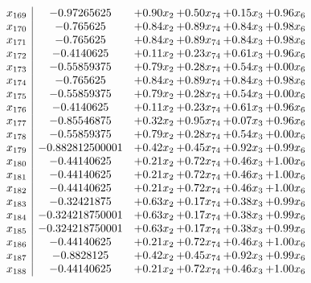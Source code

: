 \documentclass[8pt]{article}
\begin{document}
\[\begin{array}{c| c c@{\hskip 2pt} c@{\hskip 2pt} c@{\hskip 2pt} c@{\hskip 2pt} }
 x_{169}   &  -0.97265625 & +  0.90 x_{2} & +  0.50 x_{74} & +  0.15 x_{3} & +  0.96 x_{6}\\
 x_{170}   &  -0.765625 & +  0.84 x_{2} & +  0.89 x_{74} & +  0.84 x_{3} & +  0.98 x_{6}\\
 x_{171}   &  -0.765625 & +  0.84 x_{2} & +  0.89 x_{74} & +  0.84 x_{3} & +  0.98 x_{6}\\
 x_{172}   &  -0.4140625 & +  0.11 x_{2} & +  0.23 x_{74} & +  0.61 x_{3} & +  0.96 x_{6}\\
 x_{173}   &  -0.55859375 & +  0.79 x_{2} & +  0.28 x_{74} & +  0.54 x_{3} & +  0.00 x_{6}\\
 x_{174}   &  -0.765625 & +  0.84 x_{2} & +  0.89 x_{74} & +  0.84 x_{3} & +  0.98 x_{6}\\
 x_{175}   &  -0.55859375 & +  0.79 x_{2} & +  0.28 x_{74} & +  0.54 x_{3} & +  0.00 x_{6}\\
 x_{176}   &  -0.4140625 & +  0.11 x_{2} & +  0.23 x_{74} & +  0.61 x_{3} & +  0.96 x_{6}\\
 x_{177}   &  -0.85546875 & +  0.32 x_{2} & +  0.95 x_{74} & +  0.07 x_{3} & +  0.96 x_{6}\\
 x_{178}   &  -0.55859375 & +  0.79 x_{2} & +  0.28 x_{74} & +  0.54 x_{3} & +  0.00 x_{6}\\
 x_{179}   &  -0.882812500001 & +  0.42 x_{2} & +  0.45 x_{74} & +  0.92 x_{3} & +  0.99 x_{6}\\
 x_{180}   &  -0.44140625 & +  0.21 x_{2} & +  0.72 x_{74} & +  0.46 x_{3} & +  1.00 x_{6}\\
 x_{181}   &  -0.44140625 & +  0.21 x_{2} & +  0.72 x_{74} & +  0.46 x_{3} & +  1.00 x_{6}\\
 x_{182}   &  -0.44140625 & +  0.21 x_{2} & +  0.72 x_{74} & +  0.46 x_{3} & +  1.00 x_{6}\\
 x_{183}   &  -0.32421875 & +  0.63 x_{2} & +  0.17 x_{74} & +  0.38 x_{3} & +  0.99 x_{6}\\
 x_{184}   &  -0.324218750001 & +  0.63 x_{2} & +  0.17 x_{74} & +  0.38 x_{3} & +  0.99 x_{6}\\
 x_{185}   &  -0.324218750001 & +  0.63 x_{2} & +  0.17 x_{74} & +  0.38 x_{3} & +  0.99 x_{6}\\
 x_{186}   &  -0.44140625 & +  0.21 x_{2} & +  0.72 x_{74} & +  0.46 x_{3} & +  1.00 x_{6}\\
 x_{187}   &  -0.8828125 & +  0.42 x_{2} & +  0.45 x_{74} & +  0.92 x_{3} & +  0.99 x_{6}\\
 x_{188}   &  -0.44140625 & +  0.21 x_{2} & +  0.72 x_{74} & +  0.46 x_{3} & +  1.00 x_{6}\\

\end{array}\]
\end{document}
